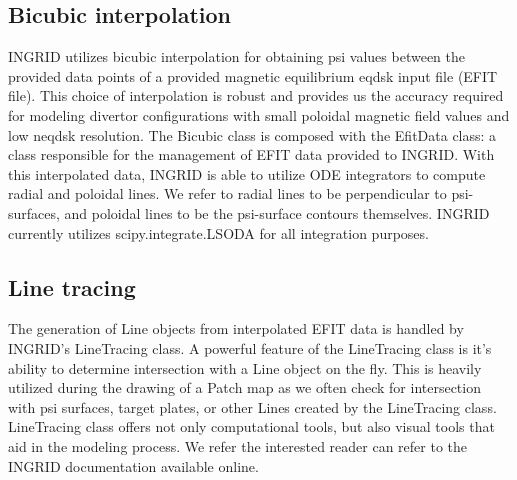\subsection{\label{sec:level2}Bicubic interpolation}
INGRID utilizes bicubic interpolation for obtaining psi values between the provided data points of a provided magnetic equilibrium eqdsk input file (EFIT file). This choice of interpolation is robust and provides us the accuracy required for modeling divertor configurations with small poloidal magnetic field values and low neqdsk resolution. The Bicubic class is composed with the EfitData class: a class responsible for the management of EFIT data provided to INGRID. With this interpolated data, INGRID is able to utilize ODE integrators to compute radial and poloidal lines. We refer to radial lines to be perpendicular to psi-surfaces, and poloidal lines to be the psi-surface contours themselves. INGRID currently utilizes scipy.integrate.LSODA for all integration purposes.

\subsection{\label{sec:level2}Line tracing}
The generation of Line objects from interpolated EFIT data is handled by INGRID's LineTracing class. A powerful feature of the LineTracing class is it's ability to determine intersection with a Line object on the fly. This is heavily utilized during the drawing of a Patch map as we often check for intersection with psi surfaces, target plates, or other Lines created by the LineTracing class. LineTracing class offers not only computational tools, but also visual tools that aid in the modeling process. We refer the interested reader can refer to the INGRID documentation available online.